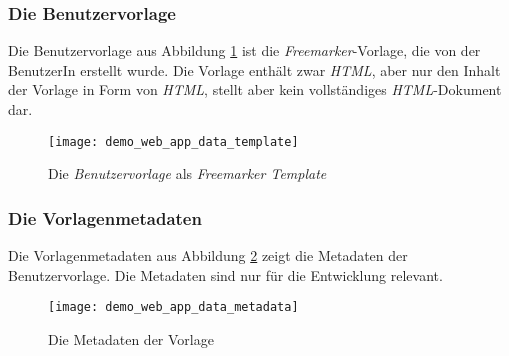 \subsubsection{Die Benutzervorlage}
Die Benutzervorlage aus Abbildung \ref{fig:demo_web_app_data_template} ist die \emph{Freemarker}-Vorlage, die von der BenutzerIn erstellt wurde. Die Vorlage enthält zwar \emph{HTML}, aber nur den Inhalt der Vorlage in Form von \emph{HTML}, stellt aber kein vollständiges \emph{HTML}-Dokument dar.
\begin{figure}[h]
\centering
\texttt{[image: demo\_web\_app\_data\_template]}
\caption{Die \emph{Benutzervorlage} als \emph{Freemarker Template}}
\label{fig:demo_web_app_data_template}
\end{figure}
\subsubsection{Die Vorlagenmetadaten}
Die Vorlagenmetadaten aus Abbildung \ref{fig:demo_web_app_data_metadata} zeigt die Metadaten der Benutzervorlage. Die Metadaten sind nur für die Entwicklung relevant.
\begin{figure}[h]
\centering
\texttt{[image: demo\_web\_app\_data\_metadata]}
\caption{Die Metadaten der Vorlage}
\label{fig:demo_web_app_data_metadata}
\end{figure}

